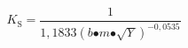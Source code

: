 \begin{equation}
K_{\mathrm{S}}\mathrm{=}\frac{\mathrm{1}}{\mathrm{1,1833}{\left(b\mathrm{\bullet }m\mathrm{\bullet }\sqrt{Y}\right)}^{\mathrm{-}\mathrm{0,0535}}}
\end{equation}